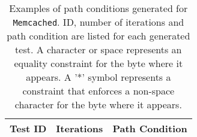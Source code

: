 \begin{table}
  \footnotesize
  \centering
  \caption{Examples of path conditions generated for {\tt Memcached}. ID, number of iterations and path condition are listed for each generated test. A character or space represents an equality constraint for the byte where it appears. A '*' symbol represents a constraint that enforces a non-space character for the byte where it appears.}
  \label{tab:memcached-explicit}
  \begin{tabularx}{\linewidth}{|l|l|X|}
  \hline
  \textbf{Test ID} & \textbf{Iterations} & \textbf{Path Condition}\\
  \hline
  
  \hline
  \end{tabularx}
\end{table}
